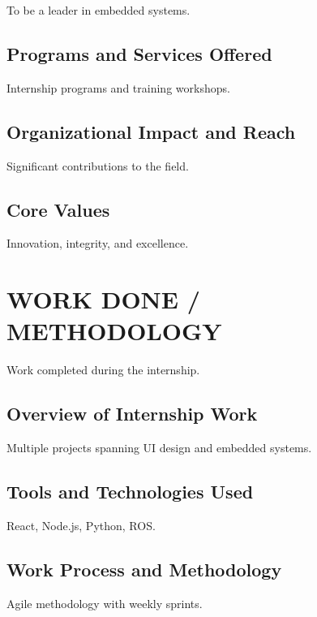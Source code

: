 \documentclass[12pt,a4paper]{report}
\begin{document}
To be a leader in embedded systems.


\section{Programs and Services Offered}

Internship programs and training workshops.


\section{Organizational Impact and Reach}

Significant contributions to the field.


\section{Core Values}

Innovation, integrity, and excellence.




\chapter{WORK DONE / METHODOLOGY}
\label{ch:work}


Work completed during the internship.


\section{Overview of Internship Work}

Multiple projects spanning UI design and embedded systems.


\section{Tools and Technologies Used}

React, Node.js, Python, ROS.




\section{Work Process and Methodology}

Agile methodology with weekly sprints.
\end{document}
